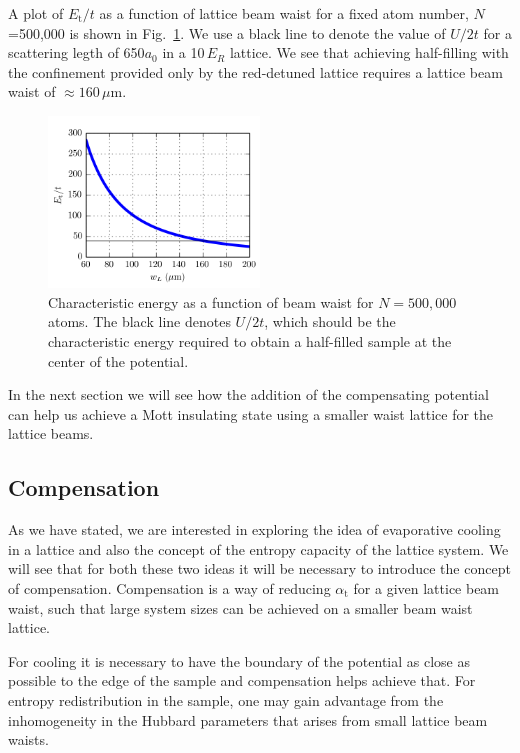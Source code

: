\documentclass[11pt,letter]{article}
\begin{document}
A plot of $E_{\text{t}}/t$ as a function of lattice beam waist for a fixed atom
number, $N$=500,000 is shown in Fig.~\ref{fig:Et-waist}.   We use a black line
to denote the value of $U/2t$ for a scattering legth of 650$a_{0}$ in a
10\,$E_{R}$ lattice.  We see that achieving half-filling with the confinement
provided only by the red-detuned lattice requires a lattice beam waist of
$\approx 160\,\mu$m.  
\begin{figure}
    \centering \includegraphics[width=0.5\textwidth]{figures/Et-waist.png}
\caption{Characteristic energy as a function of beam waist for $N=500,000$
atoms. The black line denotes $U/2t$,  which should be the
characteristic energy required to obtain a half-filled sample at the center of
the potential.}
\label{fig:Et-waist}
\end{figure}
In the next section we will see how the addition of the compensating potential
can help us achieve a Mott insulating state using a smaller waist lattice for
the lattice beams.


\subsection{Compensation}

As we have stated, we are interested in exploring the idea of evaporative
cooling in a lattice and also the concept of the entropy capacity of the
lattice system.  We will see that for both these two ideas it will be necessary
to introduce the concept of compensation.  Compensation is a way of reducing
$\alpha_{\text{t}}$ for a given lattice beam waist, such that large system
sizes can be achieved on a smaller beam waist lattice.  

For cooling it is necessary to   have the boundary of the potential as close as
possible to the edge of the sample and compensation helps achieve that.   For
entropy redistribution in the sample, one may gain advantage from the
inhomogeneity in the Hubbard parameters that arises from small lattice beam
waists.  
\end{document}
